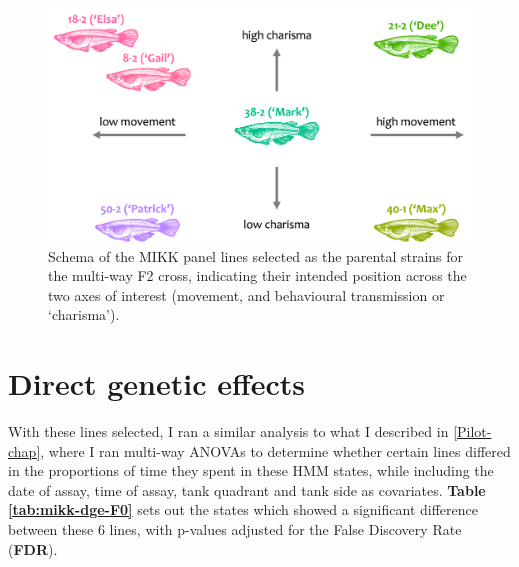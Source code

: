 \documentclass[
]{book}
\begin{document}
\begin{figure}
\includegraphics[width=1\linewidth]{figs/mikk_behaviour/line_selection_schema} \caption{Schema of the MIKK panel lines selected as the parental strains for the multi-way F2 cross, indicating their intended position across the two axes of interest (movement, and behavioural transmission or `charisma').}\label{fig:F0-line-select-schema}
\end{figure}

\hypertarget{direct-genetic-effects-1}{%
\section{Direct genetic effects}\label{direct-genetic-effects-1}}

With these lines selected, I ran a similar analysis to what I described in \ref{Pilot-chap}, where I ran multi-way ANOVAs to determine whether certain lines differed in the proportions of time they spent in these HMM states, while including the date of assay, time of assay, tank quadrant and tank side as covariates. \textbf{Table \ref{tab:mikk-dge-F0}} sets out the states which showed a significant difference between these 6 lines, with p-values adjusted for the False Discovery Rate (\textbf{FDR}).
\end{document}
